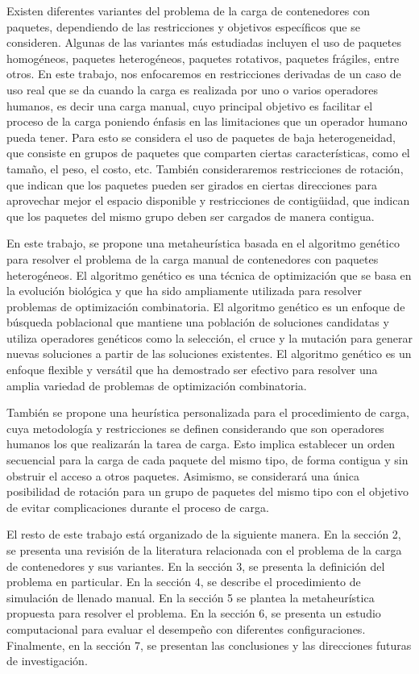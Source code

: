 Existen diferentes variantes del problema de la carga de contenedores con paquetes, dependiendo de las restricciones y objetivos específicos que se consideren. Algunas de las variantes más estudiadas incluyen el uso de paquetes homogéneos, paquetes heterogéneos, paquetes rotativos, paquetes frágiles, entre otros. En este trabajo, nos enfocaremos en restricciones derivadas de un caso de uso real que se da cuando la carga es realizada por uno o varios operadores humanos, es decir una carga manual, cuyo principal objetivo es facilitar el proceso de la carga poniendo énfasis en las limitaciones que un operador humano pueda tener. Para esto se considera el uso de paquetes de baja heterogeneidad, que consiste en grupos de paquetes que comparten ciertas características, como el tamaño, el peso, el costo, etc. También consideraremos restricciones de rotación, que indican que los paquetes pueden ser girados en ciertas direcciones para aprovechar mejor el espacio disponible y restricciones de contigüidad, que indican que los paquetes del mismo grupo deben ser cargados de manera contigua.

En este trabajo, se propone una metaheurística basada en el algoritmo genético para resolver el problema de la carga manual de contenedores con paquetes heterogéneos. El algoritmo genético es una técnica de optimización que se basa en la evolución biológica y que ha sido ampliamente utilizada para resolver problemas de optimización combinatoria. El algoritmo genético es un enfoque de búsqueda poblacional que mantiene una población de soluciones candidatas y utiliza operadores genéticos como la selección, el cruce y la mutación para generar nuevas soluciones a partir de las soluciones existentes. El algoritmo genético es un enfoque flexible y versátil que ha demostrado ser efectivo para resolver una amplia variedad de problemas de optimización combinatoria.

También se propone una heurística personalizada para el procedimiento de carga, cuya metodología y restricciones se definen considerando que son operadores humanos los que realizarán la tarea de carga. Esto implica establecer un orden secuencial para la carga de cada paquete del mismo tipo, de forma contigua y sin obstruir el acceso a otros paquetes. Asimismo, se considerará una única posibilidad de rotación para un grupo de paquetes del mismo tipo con el objetivo de evitar complicaciones durante el proceso de carga.

El resto de este trabajo está organizado de la siguiente manera. En la sección 2, se presenta una revisión de la literatura relacionada con el problema de la carga de contenedores y sus variantes. En la sección 3, se presenta la definición del problema en particular. En la sección 4, se describe el procedimiento de simulación de llenado manual. En la sección 5 se plantea la metaheurística propuesta para resolver el problema. En la sección 6, se presenta un estudio computacional para evaluar el desempeño con diferentes configuraciones. Finalmente, en la sección 7, se presentan las conclusiones y las direcciones futuras de investigación.